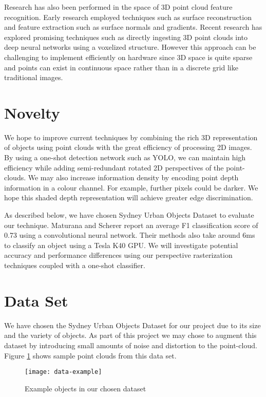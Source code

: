 \documentclass[runningheads,a4paper]{llncs}
\begin{document}
Research has also been performed in the space of 3D point cloud feature
recognition. Early research employed techniques such as surface reconstruction
and feature extraction such as surface normals and gradients. Recent research
has explored promising techniques such as directly ingesting 3D point clouds
into deep neural networks using a voxelized structure. However this approach can
be challenging to implement efficiently on hardware since 3D space is quite
sparse and points can exist in continuous space rather than in a discrete grid
like traditional images.

\section{Novelty}
We hope to improve current techniques by combining the rich 3D representation of
objects using point clouds with the great efficiency of processing 2D images. By
using a one-shot detection network such as YOLO, we can maintain high efficiency
while adding semi-redundant rotated 2D perspectives of the point-clouds. We may
also increase information density by encoding point depth information in a
colour channel. For example, further pixels could be darker. We hope this shaded
depth representation will achieve greater edge discrimination.

As described below, we have chosen Sydney Urban Objects Dataset to evaluate our
technique. Maturana and Scherer \cite{maturana2015voxnet} report an average F1
classification score of 0.73 using a convolutional neural network. Their methods 
also take around 6ms to classify an object using a Tesla K40 GPU. We
will investigate potential accuracy and performance differences using our perspective
rasterization techniques coupled with a one-shot classifier.

\section{Data Set}
We have chosen the Sydney Urban Objects Dataset for our project due to its size
and the variety of objects. As part of this project we may chose to augment this
dataset by introducing small amounts of noise and distortion to the point-cloud.
Figure \ref{fig:data-example} shows sample point clouds from this data set.

\begin{figure}[h]
  \caption{Example objects in our chosen dataset}
  \centering
  \texttt{[image: data-example]}
  \label{fig:data-example}
\end{figure}
\end{document}
